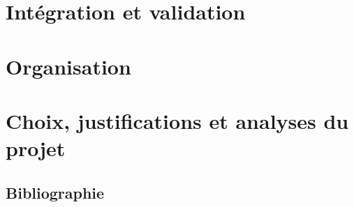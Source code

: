 \documentclass[11pt,fleqn]{book} %
\begin{document}

\part{Intégration et validation}




\part{Organisation}



\part{Choix, justifications et analyses du projet}




\chapter*{Bibliographie}


\nocite{*}


\cleardoublepage
\setlength{\columnsep}{0.75cm}
\printindex

\end{document}
